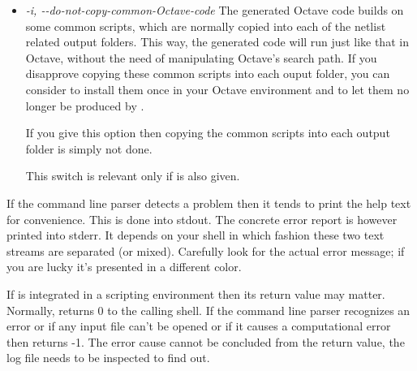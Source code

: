 \begin{itemize}
    Octave code generated from a circuit netlist will be placed into a
    folder whose name is derived from the netlist file. As many output
    folders will be created as input files are given. All of these folders
    will be placed into a common parent directory and this directory is
    designated by . If  is omitted then the
    current working directory is used as common parent directory.

    The folder path to and including the specified parent directory is
    created if it doesn't exist yet.
    
    A distinction is made regarding the generated script code, based on
    whether it is problem-specific or static (some common, always
    identical sub-routines). The static code component is generated only
    if the netlist related output folder does not already exist. This
    distinction allows the static code component to be modified locally
    without the risk of it being overwritten during a subsequent run of
    \linnet{}. See  also.

  \item \emph{-i, -{}-do-not-copy-common-Octave-code}
    The generated Octave code builds on some common scripts, which are
    normally copied into each of the netlist related output folders. This
    way, the generated code will run just like that in Octave, without the
    need of manipulating Octave's search path. If you disapprove copying
    these common scripts into each ouput folder, you can consider to
    install them once in your Octave environment and to let them no longer
    be produced by \linnet{}.

    If you give this option then copying the common scripts into each
    output folder is simply not done.

    This switch is relevant only if  is also given.

\end{itemize}

If the command line parser detects a problem then it tends to print the
help text for convenience. This is done into stdout. The concrete error
report is however printed into stderr. It depends on your shell in which
fashion these two text streams are separated (or mixed). Carefully look
for the actual error message; if you are lucky it's presented in a
different color.

If \linnet{} is integrated in a scripting environment then its return
value may matter. Normally, \linnet{} returns 0 to the calling shell. If
the command line parser recognizes an error or if any input file can't be
opened or if it causes a computational error then \linnet{} returns -1.
The error cause cannot be concluded from the return value, the log file
needs to be inspected to find out.


